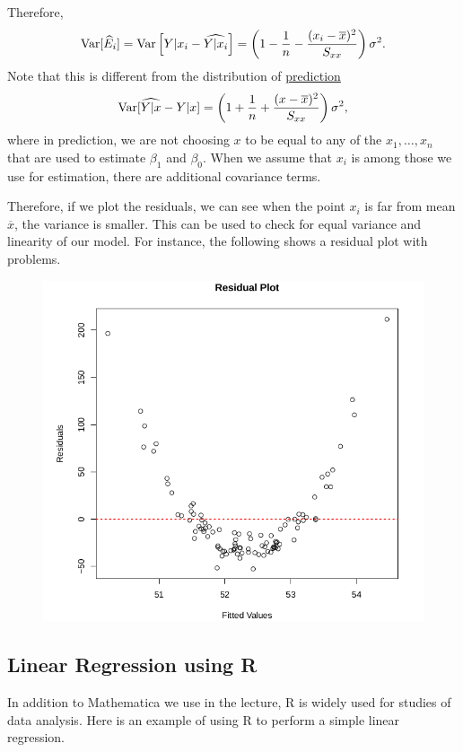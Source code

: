 Therefore,
\begin{align*}
\mathrm{Var}[\widehat{E}_i] = \mathrm{Var}\left[Y|x_i - \widehat{Y|x_i} \right] = \left(1 - \frac{1}{n} - \frac{(x_i-\overline{x})^2}{S_{xx}} \right)\sigma^2.
\end{align*}
Note that this is different from the distribution of \underline{prediction}
\begin{align*}
\mathrm{Var}[\widehat{Y|x} - Y|x] = \left(1 + \frac{1}{n} + \frac{(x-\overline{x})^2}{S_{xx}} \right)\sigma^2,
\end{align*}
where in prediction, we are not choosing $x$ to be equal to any of the $x_1, \ldots, x_n$ that are used to estimate $\beta_1$ and $\beta_0$. When we assume that $x_i$ is among those we use for estimation, there are additional covariance terms.

Therefore, if we plot the residuals, we can see when the point $x_i$ is far from mean $\overline{x}$, the variance is smaller. This can be used to check for equal variance and linearity of our model. For instance, the following shows a residual plot with problems.

\begin{figure}[H]
	\centering
	\includegraphics[width=12cm]{./images/s7fig1.png}
\end{figure}


\subsection*{Linear Regression using R}

In addition to Mathematica we use in the lecture, R is widely used for studies of data analysis. Here is an example of using R to perform a simple linear regression.

